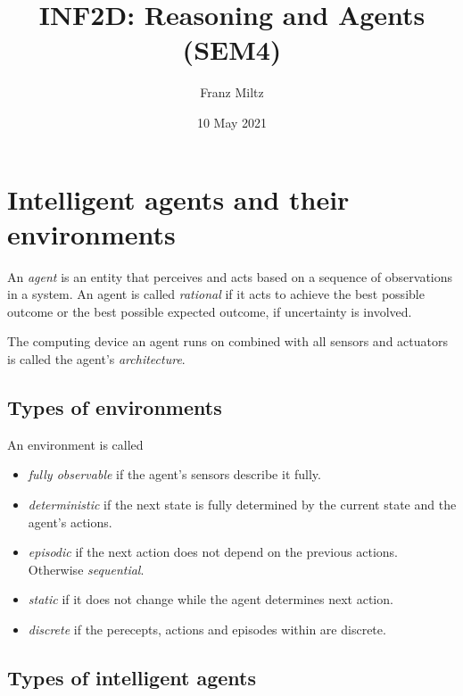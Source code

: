 \documentclass{article}
\title{INF2D: Reasoning and Agents (SEM4)}
\author{Franz Miltz}
\date{10 May 2021}
\begin{document}
\maketitle
\tableofcontents
\pagebreak

\section{Intelligent agents and their environments}

\begin{definition}
    An \emph{agent} is an entity that perceives and
    acts based on a sequence of observations in a system.
    An agent is called \emph{rational} if it acts to achieve
    the best possible outcome or the best possible expected
    outcome, if uncertainty is involved.
    
    The computing device an agent runs on combined with all sensors and actuators
    is called the agent's \emph{architecture}.
\end{definition}

\subsection{Types of environments}

\begin{definition}[R\&N p. 42]
    An environment is called
    \begin{itemize}
        \item \emph{fully observable} if the agent's sensors describe it fully.
        \item \emph{deterministic} if the next state is fully
        determined by the current state and the agent's actions.
        \item \emph{episodic} if the next action does not depend on the previous
        actions. Otherwise \emph{sequential}.
        \item \emph{static} if it does not change while the agent determines
        next action.
        \item \emph{discrete} if the perecepts, actions and episodes within
        are discrete.
    \end{itemize}
\end{definition}

\subsection{Types of intelligent agents}
\end{document}
